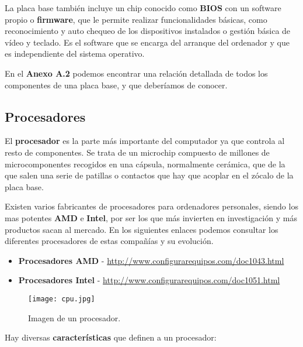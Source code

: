 La placa base también incluye un chip conocido como \textbf{\gls{BIOS}} con un software propio o \textbf{firmware}, que le permite realizar funcionalidades básicas, como reconocimiento y auto chequeo de los dispositivos instalados o gestión básica de vídeo y teclado. Es el software que se encarga del arranque del ordenador y que es independiente del sistema operativo.

En el \textbf{Anexo A.2} podemos encontrar una relación detallada de todos los componentes de una placa base, y que deberíamos de conocer.

\subsection{Procesadores}
El \textbf{procesador} es la parte más importante del computador ya que controla al resto de componentes. Se trata de un microchip compuesto de millones de microcomponentes recogidos en una cápsula, normalmente cerámica, que de la que salen una serie de patillas o contactos que hay que acoplar en el zócalo de la placa base.

Existen varios fabricantes de procesadores para ordenadores personales, siendo los mas potentes \textbf{AMD} e \textbf{Intel}, por ser los que más invierten en investigación y más productos sacan al mercado. En los siguientes enlaces podemos consultar los diferentes procesadores de estas compañías y su evolución.

\vspace{5ex}

\begin{itemize}
    \item \textbf{Procesadores AMD} - \url{http://www.configurarequipos.com/doc1043.html}
    \item \textbf{Procesadores Intel} - \url{http://www.configurarequipos.com/doc1051.html}
\end{itemize}

\begin{figure}[ht]
    \centering
    \texttt{[image: cpu.jpg]}
    \caption{Imagen de un procesador.}
\end{figure}

Hay diversas \textbf{características} que definen a un procesador:

